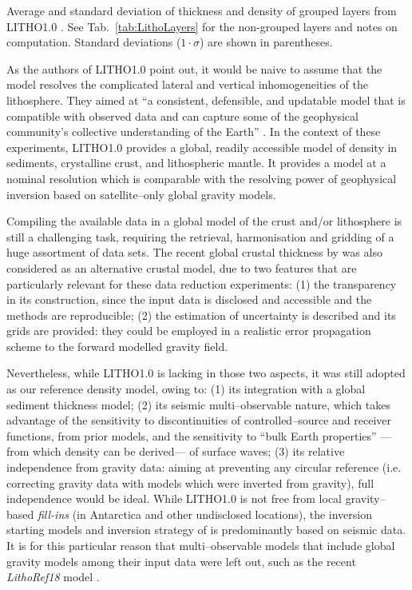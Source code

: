 \begin{table}
    \caption[Thickness and density of grouped layers from {LITHO1.0}.]{
        Average and standard deviation of thickness and density of grouped layers from {LITHO1.0} \parencite{Pasyanos2014}. See Tab.~\ref{tab:LithoLayers} for the non-grouped layers and notes on computation. Standard deviations ($1 \cdot \sigma$) are shown in parentheses.
    }
    \begin{adjustbox}{center}
        
    \end{adjustbox}
    \label{tab:LithoLayersGroups}
\end{table}

As the authors of {LITHO1.0} point out, it would be naive to assume that the model resolves the complicated lateral and vertical inhomogeneities of the lithosphere.
They aimed at ``a consistent, defensible, and updatable model that is compatible with observed data and can capture some of the geophysical community's collective understanding of the Earth'' \parencite{Pasyanos2014}.
In the context of these experiments, {LITHO1.0} provides a global, readily accessible model of density in sediments, crystalline crust, and lithospheric mantle.
It provides a model at a nominal resolution which is comparable with the resolving power of geophysical inversion based on satellite--only global gravity models.

Compiling the available data in a global model of the crust and/or lithosphere is still a challenging task, requiring the retrieval, harmonisation and gridding of a huge assortment of data sets.
The recent global crustal thickness by \textcite{Szwillus2019} was also considered as an alternative crustal model, due to two features that are particularly relevant for these data reduction experiments:
(1) the transparency in its construction, since the input data is disclosed and accessible \parencite{Mooney2015_globalcrust} and the methods are reproducible;
(2) the estimation of uncertainty is described and its grids are provided: they could be employed in a realistic error propagation scheme to the forward modelled gravity field.

Nevertheless, while {LITHO1.0} is lacking in those two aspects, it was still adopted as our reference density model, owing to:
(1) its integration with a global sediment thickness model;
(2) its seismic multi--observable nature, which takes advantage of the sensitivity to discontinuities of controlled--source and receiver functions, from prior models, and the sensitivity to ``bulk Earth properties'' ---from which density can be derived--- of surface waves;
(3) its relative independence from gravity data: aiming at preventing any circular reference (i.e. correcting gravity data with models which were inverted from gravity), full independence would be ideal. While {LITHO1.0} is not free from local gravity--based \textit{fill-ins} (in Antarctica and other undisclosed locations), the inversion starting models and inversion strategy of \textcite{Pasyanos2014} is predominantly based on seismic data.
It is for this particular reason that multi--observable models that include global gravity models among their input data were left out, such as the recent \textit{LithoRef18} model \parencite{Afonso2019}.

